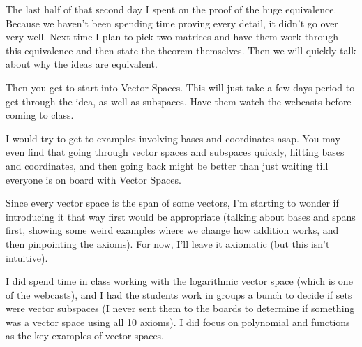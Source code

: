 The last half of that second day I spent on the proof of the huge equivalence.  Because we haven't been spending time proving every detail, it didn't go over very well.  Next time I plan to pick two matrices and have them work through this equivalence and then state the theorem themselves.  Then we will quickly talk about why the ideas are equivalent.

Then you get to start into Vector Spaces.  This will just take a few days period to get through the idea, as well as subspaces.  Have them watch the webcasts before coming to class.

I would try to get to examples involving bases and coordinates asap. You may even find that going through vector spaces and subspaces quickly, hitting bases and coordinates, and then going back might be better than just waiting till everyone is on board with Vector Spaces.

Since every vector space is the span of some vectors, I'm starting to wonder if introducing it that way first would be appropriate (talking about bases and spans first, showing some weird examples where we change how addition works, and then pinpointing the axioms).  For now, I'll leave it axiomatic (but this isn't intuitive).

I did spend time in class working with the logarithmic vector space (which is one of the webcasts), and I had the students work in groups a bunch to decide if sets were vector subspaces (I never sent them to the boards to determine if something was a vector space using all 10 axioms).  I did focus on polynomial and functions as the key examples of vector spaces.
